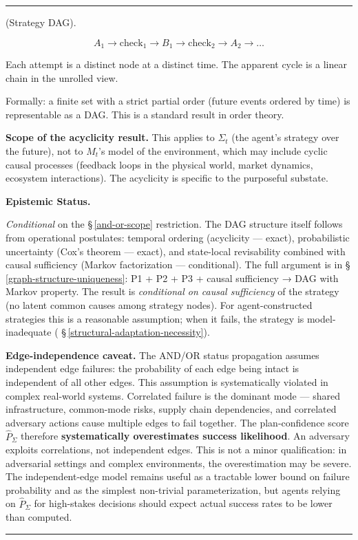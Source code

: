 \documentclass[11pt,oneside]{article}
\newcounter{claim}[section]
\renewcommand{\theclaim}{\thesection.\arabic{claim}}
\newenvironment{segment}[2]{%
  \refstepcounter{claim}%
  \bigskip\noindent\hrule\smallskip
  \noindent{\bfseries #1~\theclaim}\enskip(#2).\par\smallskip
  \noindent\ignorespaces
}{%
  \par\smallskip\noindent\hrule\bigskip
}
\newenvironment{definition}[1][]{\begin{segment}{Definition}{#1}}{\end{segment}}
\begin{document}
\begin{definition}[Strategy DAG]
$$A_1 \to \text{check}_1 \to B_1 \to \text{check}_2 \to A_2 \to \ldots$$

Each attempt is a distinct node at a distinct time. The apparent cycle is a linear chain in the unrolled view.

Formally: a finite set with a strict partial order (future events ordered by time) is representable as a DAG. This is a standard result in order theory.

\textbf{Scope of the acyclicity result.} This applies to $\Sigma_t$ (the agent's strategy over the future), not to $M_t$'s model of the environment, which may include cyclic causal processes (feedback loops in the physical world, market dynamics, ecosystem interactions). The acyclicity is specific to the purposeful substate.


\medskip\noindent\textbf{Epistemic Status.}


\textit{Conditional} on the \S\,\ref{and-or-scope} restriction. The DAG structure itself follows from operational postulates: temporal ordering (acyclicity — exact), probabilistic uncertainty (Cox's theorem — exact), and state-local revisability combined with causal sufficiency (Markov factorization — conditional). The full argument is in \S\,\ref{graph-structure-uniqueness}: P1 + P2 + P3 + causal sufficiency → DAG with Markov property. The result is \textit{conditional on causal sufficiency} of the strategy (no latent common causes among strategy nodes). For agent-constructed strategies this is a reasonable assumption; when it fails, the strategy is model-inadequate ( \S\,\ref{structural-adaptation-necessity}).

\textbf{Edge-independence caveat.} The AND/OR status propagation assumes independent edge failures: the probability of each edge being intact is independent of all other edges. This assumption is systematically violated in complex real-world systems. Correlated failure is the dominant mode — shared infrastructure, common-mode risks, supply chain dependencies, and correlated adversary actions cause multiple edges to fail together. The plan-confidence score $\hat P_\Sigma$ therefore \textbf{systematically overestimates success likelihood}. An adversary exploits correlations, not independent edges. This is not a minor qualification: in adversarial settings and complex environments, the overestimation may be severe. The independent-edge model remains useful as a tractable lower bound on failure probability and as the simplest non-trivial parameterization, but agents relying on $\hat P_\Sigma$ for high-stakes decisions should expect actual success rates to be lower than computed.


\end{definition}
\end{document}
